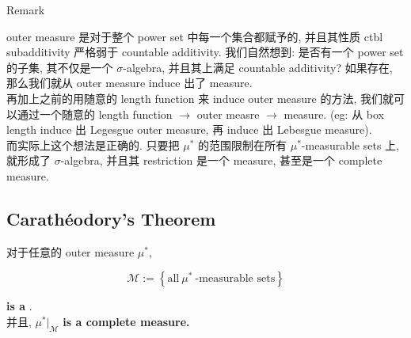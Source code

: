 \begin{qlremark}{Remark}

outer measure 是对于整个 power set 中每一个集合都赋予的, 并且其性质 ctbl subadditivity 严格弱于 countable additivity. 我们自然想到: 是否有一个 power set 的子集, 其不仅是一个 \(\sigma\)-algebra, 并且其上满足 countable additivity? 如果存在, 那么我们就从 outer measure induce 出了 measure.\\
再加上之前的用随意的 length function 来 induce outer measure 的方法, 我们就可以通过一个随意的 length function \(\rightarrow\) outer measre \(\rightarrow\) measure. (eg: 从 box length induce 出 Legesgue outer measure, 再 induce 出 Lebesgue measure).\\
而实际上这个想法是正确的. 只要把 \(\mu^{\ast}\) 的范围限制在所有 \(\mu^{\ast}\)-measurable sets 上, 就形成了 \(\sigma\)-algebra, 并且其 restriction 是一个 measure, 甚至是一个 complete measure.

\end{qlremark}

\subsection{Carathéodory's Theorem}\label{carathuxe9odorys-theorem}

\begin{theorem}{}\label{thm-02-outer-measure-completion-of-a-measurable-space-theorem-003}

对于任意的 outer measure \(\mu^{\ast}\),

\[\mathcal{M} := \left\{ {\text{all}\ \mu^{\ast}\ \text{-measurable sets}} \right\}\]

\textbf{is a }.\\
并且, \(\mu^{\ast}|_{\mathcal{M}}\) \textbf{is a complete measure.}

\end{theorem}

